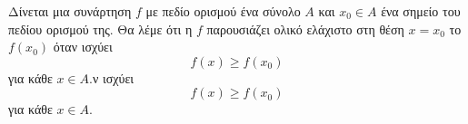 Δίνεται μια συνάρτηση $ f $ με πεδίο ορισμού ένα σύνολο $  A $ και $ x_0\in A $ ένα σημείο του πεδίου ορισμού της. Θα λέμε ότι η $ f $ παρουσιάζει ολικό ελάχιστο στη θέση $ x=x_0 $ το $ f(x_0) $ όταν ισχύει
\[ f(x)\geq f(x_0) \]
για κάθε $ x\in A $.ν ισχύει
\[ f(x)\geq f(x_0) \]
για κάθε $ x\in A $.
